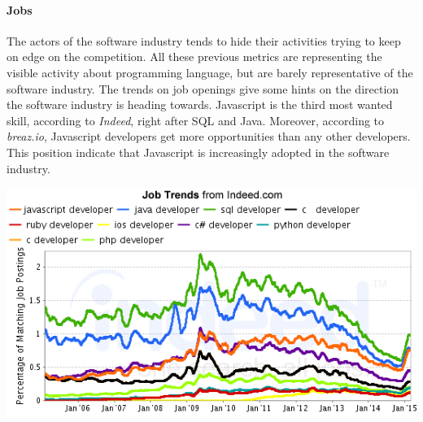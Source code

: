 
\paragraph{Jobs}

The actors of the software industry tends to hide their activities trying to keep on edge on the competition.
All these previous metrics are representing the visible activity about programming language, but are barely representative of the software industry.
The trends on job openings give some hints on the direction the software industry is heading towards.
Javascript is the third most wanted skill, according to \textit{Indeed}, right after SQL and Java.
Moreover, according to \textit{breaz.io}, Javascript developers get more opportunities than any other developers.
This position indicate that Javascript is increasingly adopted in the software industry.

\includegraphics[width=0.9\linewidth]{../../data/js-trends/jobgraph}

\paragraph{}

